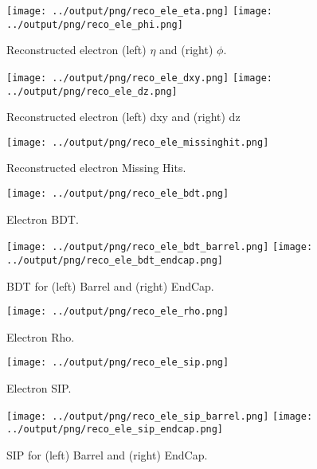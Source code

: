 \documentclass[11pt]{book}
\begin{document}
\begin{figure}[htb]
\centering
\texttt{[image: ../output/png/reco\_ele\_eta.png]}
\texttt{[image: ../output/png/reco\_ele\_phi.png]}
\caption{Reconstructed electron (left) $\eta$ and (right) $\phi$.}
\label{fig:reco_ele_eta_phi}
\end{figure}


\begin{figure}[htb]
\centering
\texttt{[image: ../output/png/reco\_ele\_dxy.png]}
\texttt{[image: ../output/png/reco\_ele\_dz.png]}
\caption{Reconstructed electron (left) dxy and (right) dz}
\label{fig:reco_ele_dxy_dz}
\end{figure}

\begin{figure}[htb]
\centering
\texttt{[image: ../output/png/reco\_ele\_missinghit.png]}
\caption{Reconstructed electron Missing Hits.}
\label{fig:reco_ele_missinghit}
\end{figure}

\begin{figure}[htb]
\centering
\texttt{[image: ../output/png/reco\_ele\_bdt.png]}
\caption{Electron BDT.}
\label{fig:reco_ele_bdt}
\end{figure}

\begin{figure}[htb]
\centering
\texttt{[image: ../output/png/reco\_ele\_bdt\_barrel.png]}
\texttt{[image: ../output/png/reco\_ele\_bdt\_endcap.png]}
\caption{BDT for (left) Barrel and (right) EndCap.}
\label{fig:reco_ele_bdt_regions}
\end{figure}

\begin{figure}[htb]
\centering
\texttt{[image: ../output/png/reco\_ele\_rho.png]}
\caption{Electron Rho.}
\label{fig:reco_ele_rho}
\end{figure}

\begin{figure}[htb]
\centering
\texttt{[image: ../output/png/reco\_ele\_sip.png]}
\caption{Electron SIP.}
\label{fig:reco_ele_sip}
\end{figure}

\begin{figure}[htb]
\centering
\texttt{[image: ../output/png/reco\_ele\_sip\_barrel.png]}
\texttt{[image: ../output/png/reco\_ele\_sip\_endcap.png]}
\caption{SIP for (left) Barrel and (right) EndCap.}
\label{fig:reco_ele_sip_regions}
\end{figure}
\end{document}
